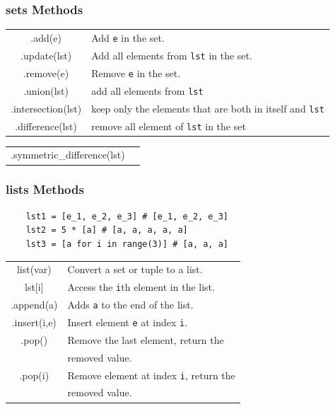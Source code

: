 \documentclass[5pt]{article}
\begin{document}
\begin{multicols}{2}
\subsubsection{sets Methods}
\begin{tabular}{C L}
    .add(e)                     & Add \texttt{e} in the set.\\
    .update(lst)                & Add all elements from \texttt{lst} in the set.\\
    .remove(e)                  & Remove \texttt{e} in the set.\\
    .union(lst)                 & add all elements from \texttt{lst}\\
    .intersection(lst)          & keep only the elements that are both in itself and \texttt{lst}\\
    .difference(lst)            & remove all element of \texttt{lst} in the set\\
\end{tabular}
\begin{tabular}{C L}
    .symmetric\_difference(lst) & \\
\end{tabular}


\subsubsection{lists Methods}
\begin{verbatim}
    lst1 = [e_1, e_2, e_3] # [e_1, e_2, e_3]
    lst2 = 5 * [a] # [a, a, a, a, a]
    lst3 = [a for i in range(3)] # [a, a, a]
\end{verbatim}
\begin{tabular}{C L}
    list(var)       & Convert a set or tuple to a list.\\
    lst[i]          & Access the \texttt{i}th element in the list.\\
    .append(a)      & Adds \texttt{a} to the end of the list.\\
    .insert(i,e)    & Insert element \texttt{e} at index \texttt{i}.\\
    .pop()          & Remove the last element, return the \\
                    & removed value.\\
    .pop(i)         & Remove element at index \texttt{i}, return the \\
                    & removed value.\\
\end{tabular}


\end{multicols}
\end{document}
